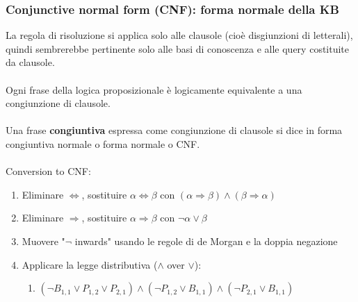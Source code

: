 \documentclass[../main.tex]{subfiles}
\begin{document}
	\subsubsection{Conjunctive normal form (CNF): forma normale della KB}
	La regola di risoluzione si applica solo alle clausole (cioè disgiunzioni di letterali), quindi sembrerebbe pertinente solo alle basi di conoscenza e alle query costituite da clausole.\\\\
	Ogni frase della logica proposizionale è logicamente equivalente a una congiunzione di clausole.\\\\
	Una frase \textbf{congiuntiva} espressa come congiunzione di clausole si dice in forma congiuntiva normale o forma normale o CNF.\\\\
	Conversion to CNF:
	\begin{enumerate}
		\item Eliminare $\Leftrightarrow$, sostituire $\alpha \Leftrightarrow \beta$ con $(\alpha \Rightarrow \beta) \wedge (\beta \Rightarrow \alpha)$
		\item Eliminare $\Rightarrow$, sostituire $\alpha \Rightarrow \beta$ con $\neg \alpha \vee \beta$
		\item Muovere "$\neg$ inwards" usando le regole di de Morgan e la doppia negazione
		\item Applicare la legge distributiva ($\wedge$ over $\vee$):
		\begin{enumerate}
			\item $(\neg B_{1,1} \vee P_{1,2} \vee P_{2,1}) \wedge (\neg P_{1,2} \vee B_{1,1}) \wedge (\neg P_{2,1} \vee B_{1,1})$
		\end{enumerate}
	\end{enumerate}
\end{document}
